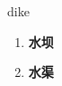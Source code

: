 
\begin{frame}
{\huge dike}
\begin{center}
\begin{enumerate}\Large
  \item \textbf{水坝}
  \item \textbf{水渠}
\end{enumerate}
\end{center}
\end{frame}
